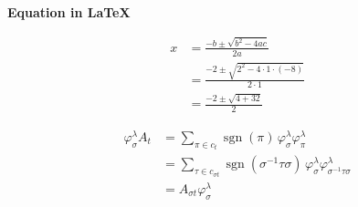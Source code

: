 \documentclass[10pt,a4paper]{article}
\begin{document}
\begin{center}
{\LARGE \textbf{Equation in \LaTeX}}
\end{center}
										
\vspace{1cm}

\noindent
\begin{minipage}[t]{0.45\textwidth}
\begin{align*}
x &=
\frac{-b\pm\sqrt{b^2-4ac}}{2a}\\[3mm]
&=
\frac{-2\pm\sqrt{2^2-4\cdot1\cdot(-8)}}{2\cdot1}\\[0.3cm]
&=
\frac{-2\pm\sqrt{4+32}}{2}
\end{align*}
\end{minipage}
\hfill
\begin{minipage}[t]{0.45\textwidth}
\begin{align*}
\varphi^\lambda_\sigma A_t
&=
\sum_{\pi\in c_t}
\operatorname{sgn}(\pi)\,
\varphi^\lambda_\sigma\varphi^\lambda_\pi\\[0.3cm]
&=
\sum_{\tau\in c_{\sigma t}}
\operatorname{sgn}(\sigma^{-1}\tau\sigma)\,
\varphi^\lambda_\sigma
\varphi^\lambda_{\sigma^{-1}\tau\sigma}\\[0.3cm]
&=
A_{\sigma t}\varphi^\lambda_\sigma
\end{align*}
\end{minipage}
\end{document}
